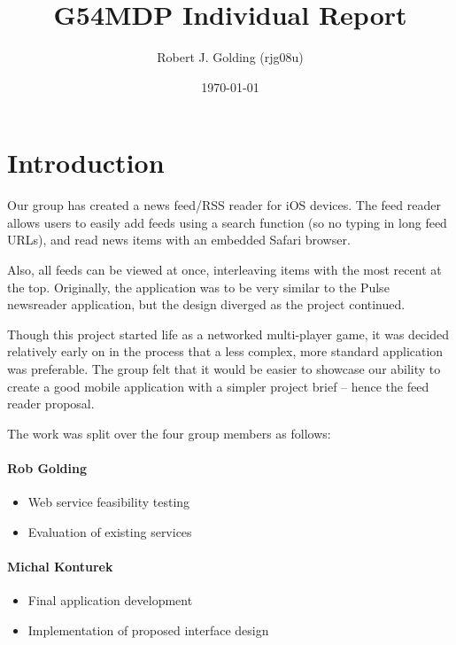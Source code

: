 \documentclass[a4paper,11pt]{article}
\title{G54MDP Individual Report}
\author{Robert J. Golding (rjg08u)} \date{\today}
\begin{document}
    \maketitle

    \section{Introduction}

    Our group has created a news feed/RSS reader for iOS devices. The feed
    reader allows users to easily add feeds using a search function (so no
    typing in long feed URLs), and read news items with an embedded Safari
    browser.
    
    Also, all feeds can be viewed at once, interleaving items with the
    most recent at the top. Originally, the application was to be very similar
    to the Pulse newsreader application, but the design diverged as the project
    continued.

    Though this project started life as a networked multi-player game, it was
    decided relatively early on in the process that a less complex, more
    standard application was preferable. The group felt that it would be easier
    to showcase our ability to create a good mobile application with a simpler
    project brief – hence the feed reader proposal.

    The work was split over the four group members as follows:

    \paragraph{Rob Golding}

    \begin{itemize}
        \item Web service feasibility testing
        \item Evaluation of existing services
    \end{itemize}

    \paragraph{Michal Konturek}

    \begin{itemize}
        \item Final application development
        \item Implementation of proposed interface design
    \end{itemize}
\end{document}
